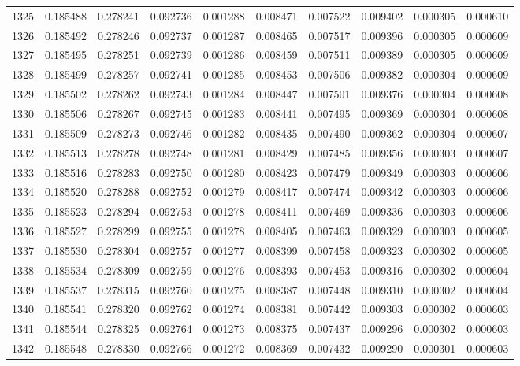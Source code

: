 \begin{tabular}{lrrrrrrrrr}
1325 & 0.185488 & 0.278241 & 0.092736 & 0.001288 & 0.008471 & 0.007522 & 0.009402 & 0.000305 & 0.000610 \\
1326 & 0.185492 & 0.278246 & 0.092737 & 0.001287 & 0.008465 & 0.007517 & 0.009396 & 0.000305 & 0.000609 \\
1327 & 0.185495 & 0.278251 & 0.092739 & 0.001286 & 0.008459 & 0.007511 & 0.009389 & 0.000305 & 0.000609 \\
1328 & 0.185499 & 0.278257 & 0.092741 & 0.001285 & 0.008453 & 0.007506 & 0.009382 & 0.000304 & 0.000609 \\
1329 & 0.185502 & 0.278262 & 0.092743 & 0.001284 & 0.008447 & 0.007501 & 0.009376 & 0.000304 & 0.000608 \\
1330 & 0.185506 & 0.278267 & 0.092745 & 0.001283 & 0.008441 & 0.007495 & 0.009369 & 0.000304 & 0.000608 \\
1331 & 0.185509 & 0.278273 & 0.092746 & 0.001282 & 0.008435 & 0.007490 & 0.009362 & 0.000304 & 0.000607 \\
1332 & 0.185513 & 0.278278 & 0.092748 & 0.001281 & 0.008429 & 0.007485 & 0.009356 & 0.000303 & 0.000607 \\
1333 & 0.185516 & 0.278283 & 0.092750 & 0.001280 & 0.008423 & 0.007479 & 0.009349 & 0.000303 & 0.000606 \\
1334 & 0.185520 & 0.278288 & 0.092752 & 0.001279 & 0.008417 & 0.007474 & 0.009342 & 0.000303 & 0.000606 \\
1335 & 0.185523 & 0.278294 & 0.092753 & 0.001278 & 0.008411 & 0.007469 & 0.009336 & 0.000303 & 0.000606 \\
1336 & 0.185527 & 0.278299 & 0.092755 & 0.001278 & 0.008405 & 0.007463 & 0.009329 & 0.000303 & 0.000605 \\
1337 & 0.185530 & 0.278304 & 0.092757 & 0.001277 & 0.008399 & 0.007458 & 0.009323 & 0.000302 & 0.000605 \\
1338 & 0.185534 & 0.278309 & 0.092759 & 0.001276 & 0.008393 & 0.007453 & 0.009316 & 0.000302 & 0.000604 \\
1339 & 0.185537 & 0.278315 & 0.092760 & 0.001275 & 0.008387 & 0.007448 & 0.009310 & 0.000302 & 0.000604 \\
1340 & 0.185541 & 0.278320 & 0.092762 & 0.001274 & 0.008381 & 0.007442 & 0.009303 & 0.000302 & 0.000603 \\
1341 & 0.185544 & 0.278325 & 0.092764 & 0.001273 & 0.008375 & 0.007437 & 0.009296 & 0.000302 & 0.000603 \\
1342 & 0.185548 & 0.278330 & 0.092766 & 0.001272 & 0.008369 & 0.007432 & 0.009290 & 0.000301 & 0.000603 \\

\end{tabular}
